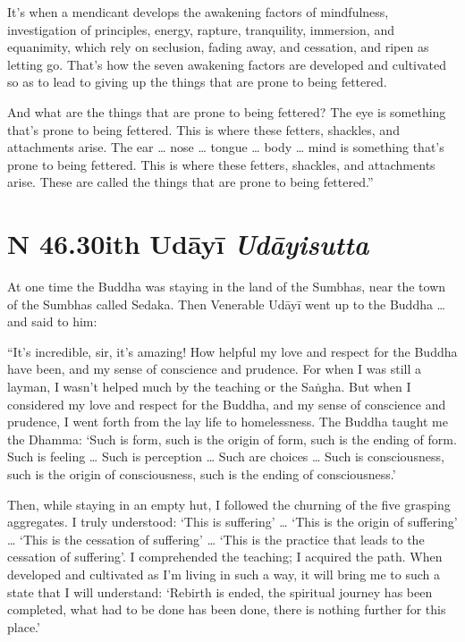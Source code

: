 \documentclass[12pt,openany]{book}%
\newcommand*{\suttatitleacronym}[1]{\smaller[2]{#1}\vspace*{.3em}}
\newcommand*{\suttatitletranslation}[1]{\linebreak{#1}}
\newcommand*{\suttatitleroot}[1]{\linebreak\smaller[2]\itshape{#1}}
\newcommand*{\tocacronym}[1]{\hspace*{-3.3em}{#1}\quad}
\newcommand*{\toctranslation}[1]{#1}
\newcommand*{\tocroot}[1]{(\textit{#1})}
\begin{document}
It’s when a mendicant develops the awakening factors of mindfulness, investigation of principles, energy, rapture, tranquility, immersion, and equanimity, which rely on seclusion, fading away, and cessation, and ripen as letting go. That’s how the seven awakening factors are developed and cultivated so as to lead to giving up the things that are prone to being fettered. 

And what are the things that are prone to being fettered? The eye is something that’s prone to being fettered. This is where these fetters, shackles, and attachments arise. The ear … nose … tongue … body … mind is something that’s prone to being fettered. This is where these fetters, shackles, and attachments arise. These are called the things that are prone to being fettered.” 

%
\section*{{\suttatitleacronym SN 46.30}{\suttatitletranslation With Udāyī }{\suttatitleroot Udāyisutta}}
\addcontentsline{toc}{section}{\tocacronym{SN 46.30} \toctranslation{With Udāyī } \tocroot{Udāyisutta}}

At one time the Buddha was staying in the land of the Sumbhas, near the town of the Sumbhas called Sedaka. Then Venerable \textsanskrit{Udāyī} went up to the Buddha … and said to him: 

“It’s incredible, sir, it’s amazing! How helpful my love and respect for the Buddha have been, and my sense of conscience and prudence. For when I was still a layman, I wasn’t helped much by the teaching or the \textsanskrit{Saṅgha}. But when I considered my love and respect for the Buddha, and my sense of conscience and prudence, I went forth from the lay life to homelessness. The Buddha taught me the Dhamma: ‘Such is form, such is the origin of form, such is the ending of form. Such is feeling … Such is perception … Such are choices … Such is consciousness, such is the origin of consciousness, such is the ending of consciousness.’ 

Then, while staying in an empty hut, I followed the churning of the five grasping aggregates. I truly understood: ‘This is suffering’ … ‘This is the origin of suffering’ … ‘This is the cessation of suffering’ … ‘This is the practice that leads to the cessation of suffering’. I comprehended the teaching; I acquired the path. When developed and cultivated as I’m living in such a way, it will bring me to such a state that I will understand: ‘Rebirth is ended, the spiritual journey has been completed, what had to be done has been done, there is nothing further for this place.’ 
\end{document}
